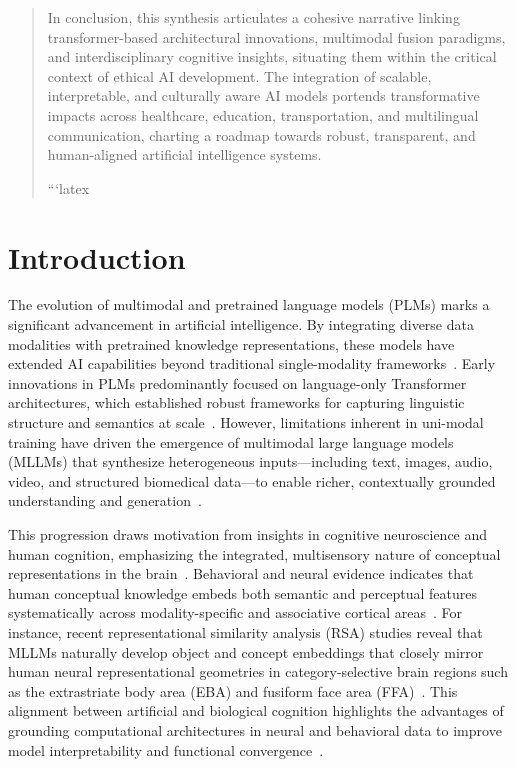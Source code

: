 \documentclass[sigconf]{acmart}
\begin{document}
\begin{abstract}
In conclusion, this synthesis articulates a cohesive narrative linking transformer-based architectural innovations, multimodal fusion paradigms, and interdisciplinary cognitive insights, situating them within the critical context of ethical AI development. The integration of scalable, interpretable, and culturally aware AI models portends transformative impacts across healthcare, education, transportation, and multilingual communication, charting a roadmap towards robust, transparent, and human-aligned artificial intelligence systems.

```latex
\end{abstract}

\maketitle

\section{Introduction}

The evolution of multimodal and pretrained language models (PLMs) marks a significant advancement in artificial intelligence. By integrating diverse data modalities with pretrained knowledge representations, these models have extended AI capabilities beyond traditional single-modality frameworks~\cite{ref41}. Early innovations in PLMs predominantly focused on language-only Transformer architectures, which established robust frameworks for capturing linguistic structure and semantics at scale~\cite{ref13}. However, limitations inherent in uni-modal training have driven the emergence of multimodal large language models (MLLMs) that synthesize heterogeneous inputs—including text, images, audio, video, and structured biomedical data—to enable richer, contextually grounded understanding and generation~\cite{ref15,ref41}.

This progression draws motivation from insights in cognitive neuroscience and human cognition, emphasizing the integrated, multisensory nature of conceptual representations in the brain~\cite{ref1,ref2}. Behavioral and neural evidence indicates that human conceptual knowledge embeds both semantic and perceptual features systematically across modality-specific and associative cortical areas~\cite{ref3,ref4}. For instance, recent representational similarity analysis (RSA) studies reveal that MLLMs naturally develop object and concept embeddings that closely mirror human neural representational geometries in category-selective brain regions such as the extrastriate body area (EBA) and fusiform face area (FFA)~\cite{ref1}. This alignment between artificial and biological cognition highlights the advantages of grounding computational architectures in neural and behavioral data to improve model interpretability and functional convergence~\cite{ref5}.
\end{document}

